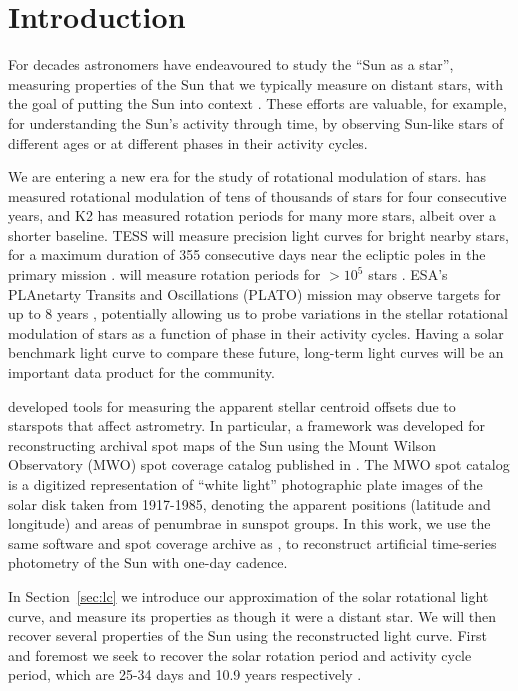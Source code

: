 \section{Introduction}

For decades astronomers have endeavoured to study the ``Sun as a star'', measuring properties of the Sun that we typically measure on distant stars, with the goal of putting the Sun into context \citep[e.g.:][]{Livingston1991, Tayler1996, Chaplin2004, Livingston2007, Hall2009, Bertello2012, Hall2015, Egeland2017}. These efforts are valuable, for example, for understanding the Sun's activity through time, by observing Sun-like stars of different ages or at different phases in their activity cycles.

We are entering a new era for the study of rotational modulation of stars. \kepler has measured rotational modulation of tens of thousands of stars for four consecutive years, and K2 has measured rotation periods for many more stars, albeit over a shorter baseline. TESS will measure precision light curves for bright nearby stars, for a maximum duration of 355 consecutive days near the ecliptic poles in the primary mission \citep{Ricker2014, Sullivan2015}. \gaia will measure rotation periods for $>10^5$ stars \citep[see, e.g.][]{Lanzafame2018}. ESA's PLAnetarty Transits and Oscillations (PLATO) mission may observe targets for up to 8 years \citep{Rauer2014}, potentially allowing us to probe variations in the stellar rotational modulation of stars as a function of phase in their activity cycles. Having a solar benchmark light curve to compare these future, long-term light curves will be an important data product for the community.  

\citet{Morris2018b} developed tools for measuring the apparent stellar centroid offsets due to starspots that affect \gaia astrometry. In particular, a framework was developed for reconstructing archival spot maps of the Sun using the Mount Wilson Observatory (MWO) spot coverage catalog published in \citet{Howard1984}. The MWO spot catalog is a digitized representation of ``white light'' photographic plate images of the solar disk taken from 1917-1985, denoting the apparent positions (latitude and longitude) and areas of penumbrae in sunspot groups. In this work, we use the same software and spot coverage archive as \citet{Morris2018b}, to reconstruct artificial time-series photometry of the Sun with one-day cadence. 

In Section~\ref{sec:lc} we introduce our approximation of the solar rotational light curve, and measure its properties as though it were a distant star. We will then recover several properties of the Sun using the reconstructed light curve. First and foremost we seek to recover the solar rotation period and activity cycle period, which are 25-34 days and 10.9 years respectively \citep{Howe2000, Hathaway2015}. 


